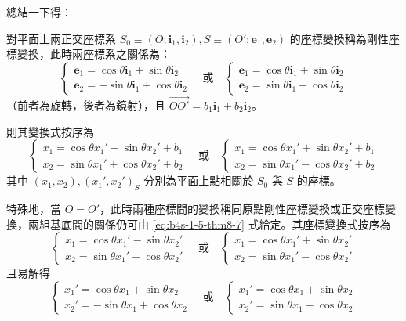 總結一下得：

\begin{theorem}[定理 8]
對平面上兩正交座標系 $S_0 \equiv (O; \mathbf{i}_1, \mathbf{i}_2), S \equiv (O'; \mathbf{e}_1, \mathbf{e}_2)$ 的座標變換稱為剛性座標變換，此時兩座標系之關係為：
\begin{equation}
\begin{cases}
\mathbf{e}_1 = \cos\theta\mathbf{i}_1 + \sin\theta\mathbf{i}_2 \\
\mathbf{e}_2 = -\sin\theta\mathbf{i}_1 + \cos\theta\mathbf{i}_2
\end{cases} \quad \text{或} \quad
\begin{cases}
\mathbf{e}_1 = \cos\theta\mathbf{i}_1 + \sin\theta\mathbf{i}_2 \\
\mathbf{e}_2 = \sin\theta\mathbf{i}_1 - \cos\theta\mathbf{i}_2
\end{cases} \label{eq:b4s-1-5-thm8-7}
\end{equation}
（前者為旋轉，後者為鏡射），且 $\vec{OO'} = b_1\mathbf{i}_1 + b_2\mathbf{i}_2$。

則其變換式按序為
\begin{equation}
\begin{cases}
x_1 = \cos\theta x_1' - \sin\theta x_2' + b_1 \\
x_2 = \sin\theta x_1' + \cos\theta x_2' + b_2
\end{cases} \quad \text{或} \quad
\begin{cases}
x_1 = \cos\theta x_1' + \sin\theta x_2' + b_1 \\
x_2 = \sin\theta x_1' - \cos\theta x_2' + b_2
\end{cases} \label{eq:b4s-1-5-thm8-6}
\end{equation}
其中 $(x_1, x_2), (x_1', x_2')_S$ 分別為平面上點相關於 $S_0$ 與 $S$ 的座標。

特殊地，當 $O = O'$，此時兩種座標間的變換稱同原點剛性座標變換或正交座標變換，兩組基底間的關係仍可由 \eqref{eq:b4s-1-5-thm8-7} 式給定。其座標變換式按序為
\[ \begin{cases} x_1 = \cos\theta x_1' - \sin\theta x_2' \\ x_2 = \sin\theta x_1' + \cos\theta x_2' \end{cases} \quad \text{或} \quad \begin{cases} x_1 = \cos\theta x_1' + \sin\theta x_2' \\ x_2 = \sin\theta x_1' - \cos\theta x_2' \end{cases} \]
且易解得
\[ \begin{cases} x_1' = \cos\theta x_1 + \sin\theta x_2 \\ x_2' = -\sin\theta x_1 + \cos\theta x_2 \end{cases} \quad \text{或} \quad \begin{cases} x_1' = \cos\theta x_1 + \sin\theta x_2 \\ x_2' = \sin\theta x_1 - \cos\theta x_2 \end{cases} \]
\end{theorem}

